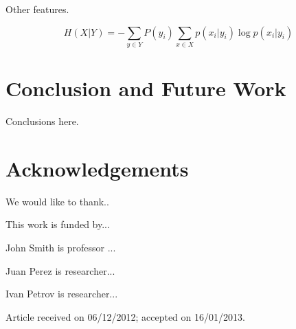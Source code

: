 \documentclass{cys}
\begin{document}
Other features.

\begin{equation}
H(X|Y) = - \sum_{y \in Y} P(y_i) \sum_{x \in X} p(x_i|y_i)\log p(x_i|y_i)
\label{equation:conditionalEntropy1}
\end{equation}


\section{Conclusion and Future Work}
\label{sec:conclusionAndFutureWork}

Conclusions here.

\section*{Acknowledgements} 
We would like to thank.. 

This work is funded by...


\small{


}
\normalsize


\begin{biography}{John Smith} 
is professor ...
\end{biography}

\begin{biography}{Juan Perez} 
is researcher...
\end{biography}

\begin{biography}{Ivan Petrov} 
is researcher...
\end{biography}


{\vskip 12pt}
\noindent
\footnotesize {Article received on 06/12/2012; accepted on 16/01/2013.}
\end{document}
